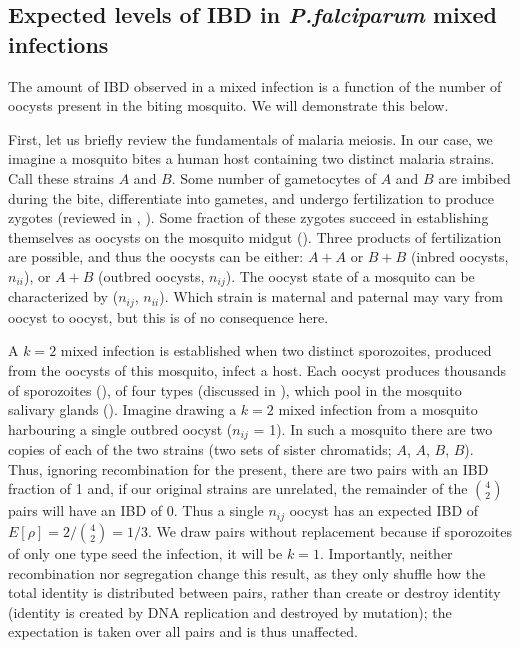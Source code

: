 \documentclass[9pt,lineno]{elife}
\begin{document}
\begin{appendixbox}
\section{Expected levels of IBD in \textit{ P.falciparum } mixed infections}

The amount of IBD observed in a mixed infection is a function of the number of oocysts present in the biting mosquito. We will demonstrate this below.

First, let us briefly review the fundamentals of malaria meiosis. In our case, we imagine a mosquito bites a human host containing two distinct malaria strains. Call these strains $A$ and $B$. Some number of gametocytes of $A$ and $B$ are imbibed during the bite, differentiate into gametes, and undergo fertilization to produce zygotes (reviewed in \citet{Gosh2000}, \citet{Bennink2016}). Some fraction of these zygotes succeed in establishing themselves as oocysts on the mosquito midgut (\citet{Gosh2000}). Three products of fertilization are possible, and thus the oocysts can be either: $A+A$ or $B+B$ (inbred oocysts, $n_{ii}$), or $A+B$ (outbred oocysts, $n_{ij}$). The oocyst state of a mosquito can be characterized by ($n_{ij}$, $n_{ii}$). Which strain is maternal and paternal may vary from oocyst to oocyst, but this is of no consequence here.

A $k=2$ mixed infection is established when two distinct sporozoites, produced from the oocysts of this mosquito, infect a host. Each oocyst produces thousands of sporozoites (\citet{Beir1991}), of four types (discussed in \citet{McKenzie2001}), which pool in the mosquito salivary glands (\citet{Gosh2000}). Imagine drawing a $k=2$ mixed infection from a mosquito harbouring a single outbred oocyst ($n_{ij}$ = 1). In such a mosquito there are two copies of each of the two strains (two sets of sister chromatids; $A$, $A$, $B$, $B$). Thus, ignoring recombination for the present, there are two pairs with an IBD fraction of 1 and, if our original strains are unrelated, the remainder of the ${4 \choose 2}$ pairs will have an IBD of 0. Thus a single $n_{ij}$ oocyst has an expected IBD of $E[\rho]= 2/{4 \choose 2} = 1/3$. We draw pairs without replacement because if sporozoites of only one type seed the infection, it will be $k=1$.  Importantly, neither recombination nor segregation change this result, as they only shuffle how the total identity is distributed between pairs, rather than create or destroy identity (identity is created by DNA replication and destroyed by mutation); the expectation is taken over all pairs and is thus unaffected.


\end{appendixbox}
\end{document}
